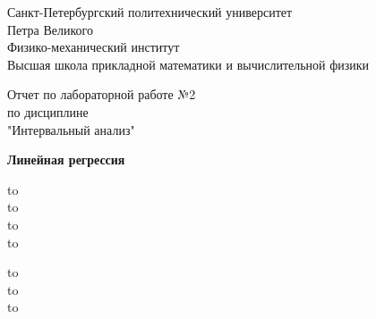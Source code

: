 \documentclass[10pt]{article}
\begin{document}
\begin{titlepage}

\Large

\begin{center}

Санкт-Петербургский политехнический университет \\ Петра Великого \\
Физико-механический институт \\
Высшая школа прикладной математики и вычислительной
физики

\vspace{6em}

Отчет по лабораторной работе №2\\
по дисциплине\\
"Интервальный анализ"\\

\vspace{2em}

\textbf{Линейная регрессия}\\

\end{center}


\vspace{5em}

\newbox{\lbox}

\newlength{\maxl}
\setlength{\maxl}{\wd\lbox}

\hfill\parbox{12cm}{
\hspace*{3cm}\hspace*{-5cm}\hfill\hbox to\maxl{ \hfill}\\
\vspace{0.5em}
\hspace*{3cm}\hspace*{-5cm}\hfill\hbox to\\
\hspace*{3cm}\hspace*{-5cm}\hfill\hbox to\\
\hspace*{3cm}\hspace*{-5cm}\hfill\hbox to\\

\vspace{0.5em}

\hspace*{3cm}\hspace*{-5cm}\hfill\hbox to\\
\hspace*{3cm}\hspace*{-5cm}\hfill\hbox to\\
\hspace*{3cm}\hspace*{-5cm}\hfill\hbox to\\
}



\end{titlepage}
\end{document}
